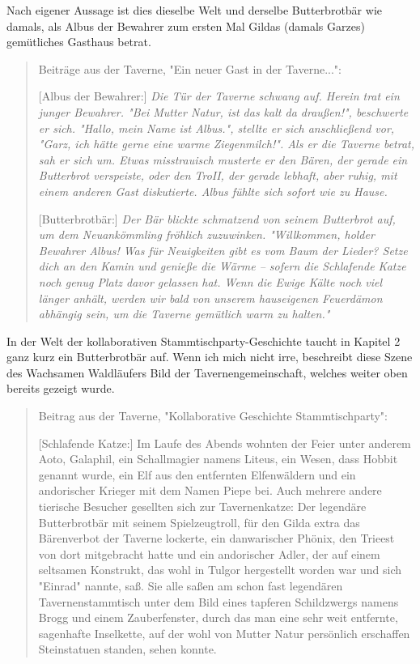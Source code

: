 \documentclass[10pt, a4paper, oneside]{book}
\begin{document}
{ Nach eigener Aussage ist dies dieselbe Welt und derselbe Butterbrotbär wie damals, als Albus der Bewahrer zum ersten Mal Gildas (damals Garzes) gemütliches Gasthaus betrat.
 
\begin{quote}
    Beiträge aus der Taverne, "Ein neuer Gast in der Taverne...": 
    
    [Albus der Bewahrer:] \textit{Die Tür der Taverne schwang auf. Herein trat ein junger Bewahrer. "Bei Mutter Natur, ist das kalt da draußen!", beschwerte er sich. "Hallo, mein Name ist Albus.", stellte er sich anschließend vor, "Garz, ich hätte gerne eine warme Ziegenmilch!". Als er die Taverne betrat, sah er sich um. Etwas misstrauisch musterte er den Bären, der gerade ein Butterbrot verspeiste, oder den TroII, der gerade lebhaft, aber ruhig, mit einem anderen Gast diskutierte. Albus fühlte sich sofort wie zu Hause.} 
    
    [Butterbrotbär:] \textit{Der Bär blickte schmatzend von seinem Butterbrot auf, um dem Neuankömmling fröhlich zuzuwinken. "Willkommen, holder Bewahrer Albus! Was für Neuigkeiten gibt es vom Baum der Lieder? Setze dich an den Kamin und genieße die Wärme – sofern die Schlafende Katze noch genug Platz davor gelassen hat. Wenn die Ewige Kälte noch viel länger anhält, werden wir bald von unserem hauseigenen Feuerdämon abhängig sein, um die Taverne gemütlich warm zu halten."}
\end{quote}

In der Welt der kollaborativen Stammtischparty-Geschichte taucht in Kapitel 2 ganz kurz ein Butterbrotbär auf. Wenn ich mich nicht irre, beschreibt diese Szene des Wachsamen Waldläufers Bild der Tavernengemeinschaft, welches weiter oben bereits gezeigt wurde.

\begin{quote}
    Beitrag aus der Taverne, "Kollaborative Geschichte Stammtischparty": 
    
    [Schlafende Katze:] Im Laufe des Abends wohnten der Feier unter anderem Aoto, Galaphil, ein Schallmagier namens Liteus, ein Wesen, dass Hobbit genannt wurde, ein Elf aus den entfernten Elfenwäldern und ein andorischer Krieger mit dem Namen Piepe bei. Auch mehrere andere tierische Besucher gesellten sich zur Tavernenkatze: Der legendäre Butterbrotbär mit seinem Spielzeugtroll, für den Gilda extra das Bärenverbot der Taverne lockerte, ein danwarischer Phönix, den Trieest von dort mitgebracht hatte und ein andorischer Adler, der auf einem seltsamen Konstrukt, das wohl in Tulgor hergestellt worden war und sich "Einrad" nannte, saß. Sie alle saßen am schon fast legendären Tavernenstammtisch unter dem Bild eines tapferen Schildzwergs namens Brogg und einem Zauberfenster, durch das man eine sehr weit entfernte, sagenhafte Inselkette, auf der wohl von Mutter Natur persönlich erschaffen Steinstatuen standen, sehen konnte.
\end{quote}

}
\end{document}
